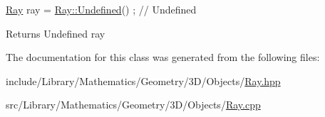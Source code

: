 \begin{DoxyCode}
\hyperlink{classlibrary_1_1math_1_1geom_1_1d3_1_1objects_1_1_ray_a11b7613464daaebc6e25a758b057f203}{Ray} ray = \hyperlink{classlibrary_1_1math_1_1geom_1_1d3_1_1objects_1_1_ray_abf40bfaeab9e9024fd1fc73893da09e0}{Ray::Undefined}() ; \textcolor{comment}{// Undefined}
\end{DoxyCode}


\begin{DoxyReturn}{Returns}
Undefined ray 
\end{DoxyReturn}


The documentation for this class was generated from the following files\+:\begin{DoxyCompactItemize}
\item 
include/\+Library/\+Mathematics/\+Geometry/3\+D/\+Objects/\hyperlink{_ray_8hpp}{Ray.\+hpp}\item 
src/\+Library/\+Mathematics/\+Geometry/3\+D/\+Objects/\hyperlink{_ray_8cpp}{Ray.\+cpp}\end{DoxyCompactItemize}

